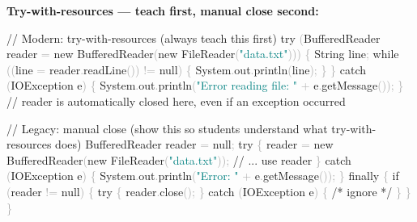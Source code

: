 \documentclass[
  justified,
  openright,
]{tufte-book}
\newcommand{\BuiltInTok}[1]{#1}
\newcommand{\CommentTok}[1]{\textcolor{MidGray}{#1}}
\newcommand{\ControlFlowTok}[1]{\textcolor{BrandBlue}{#1}}
\newcommand{\FunctionTok}[1]{\textcolor{BrandBlue}{#1}}
\newcommand{\KeywordTok}[1]{\textcolor{BrandBlue}{#1}}
\newcommand{\NormalTok}[1]{#1}
\newcommand{\OperatorTok}[1]{\textcolor{DarkGray}{#1}}
\newcommand{\StringTok}[1]{\textcolor{Teal}{#1}}
\newenvironment{Shaded}{%
  \begin{snugshade}
}{%
  \end{snugshade}
}
\begin{document}
\textbf{Try-with-resources --- teach first, manual close second:}

\begin{Shaded}
\begin{Highlighting}[]
\CommentTok{// Modern: try{-}with{-}resources (always teach this first)}
\ControlFlowTok{try} \OperatorTok{(}\BuiltInTok{BufferedReader}\NormalTok{ reader }\OperatorTok{=} \KeywordTok{new} \BuiltInTok{BufferedReader}\OperatorTok{(}\KeywordTok{new} \BuiltInTok{FileReader}\OperatorTok{(}\StringTok{"data.txt"}\OperatorTok{)))} \OperatorTok{\{}
    \BuiltInTok{String}\NormalTok{ line}\OperatorTok{;}
    \ControlFlowTok{while} \OperatorTok{((}\NormalTok{line }\OperatorTok{=}\NormalTok{ reader}\OperatorTok{.}\FunctionTok{readLine}\OperatorTok{())} \OperatorTok{!=} \KeywordTok{null}\OperatorTok{)} \OperatorTok{\{}
        \BuiltInTok{System}\OperatorTok{.}\FunctionTok{out}\OperatorTok{.}\FunctionTok{println}\OperatorTok{(}\NormalTok{line}\OperatorTok{);}
    \OperatorTok{\}}
\OperatorTok{\}} \ControlFlowTok{catch} \OperatorTok{(}\BuiltInTok{IOException}\NormalTok{ e}\OperatorTok{)} \OperatorTok{\{}
    \BuiltInTok{System}\OperatorTok{.}\FunctionTok{out}\OperatorTok{.}\FunctionTok{println}\OperatorTok{(}\StringTok{"Error reading file: "} \OperatorTok{+}\NormalTok{ e}\OperatorTok{.}\FunctionTok{getMessage}\OperatorTok{());}
\OperatorTok{\}}
\CommentTok{// reader is automatically closed here, even if an exception occurred}

\CommentTok{// Legacy: manual close (show this so students understand what try{-}with{-}resources does)}
\BuiltInTok{BufferedReader}\NormalTok{ reader }\OperatorTok{=} \KeywordTok{null}\OperatorTok{;}
\ControlFlowTok{try} \OperatorTok{\{}
\NormalTok{    reader }\OperatorTok{=} \KeywordTok{new} \BuiltInTok{BufferedReader}\OperatorTok{(}\KeywordTok{new} \BuiltInTok{FileReader}\OperatorTok{(}\StringTok{"data.txt"}\OperatorTok{));}
    \CommentTok{// ... use reader}
\OperatorTok{\}} \ControlFlowTok{catch} \OperatorTok{(}\BuiltInTok{IOException}\NormalTok{ e}\OperatorTok{)} \OperatorTok{\{}
    \BuiltInTok{System}\OperatorTok{.}\FunctionTok{out}\OperatorTok{.}\FunctionTok{println}\OperatorTok{(}\StringTok{"Error: "} \OperatorTok{+}\NormalTok{ e}\OperatorTok{.}\FunctionTok{getMessage}\OperatorTok{());}
\OperatorTok{\}} \ControlFlowTok{finally} \OperatorTok{\{}
    \ControlFlowTok{if} \OperatorTok{(}\NormalTok{reader }\OperatorTok{!=} \KeywordTok{null}\OperatorTok{)} \OperatorTok{\{}
        \ControlFlowTok{try} \OperatorTok{\{}\NormalTok{ reader}\OperatorTok{.}\FunctionTok{close}\OperatorTok{();} \OperatorTok{\}} \ControlFlowTok{catch} \OperatorTok{(}\BuiltInTok{IOException}\NormalTok{ e}\OperatorTok{)} \OperatorTok{\{} \CommentTok{/* ignore */} \OperatorTok{\}}
    \OperatorTok{\}}
\OperatorTok{\}}
\end{Highlighting}
\end{Shaded}
\end{document}
